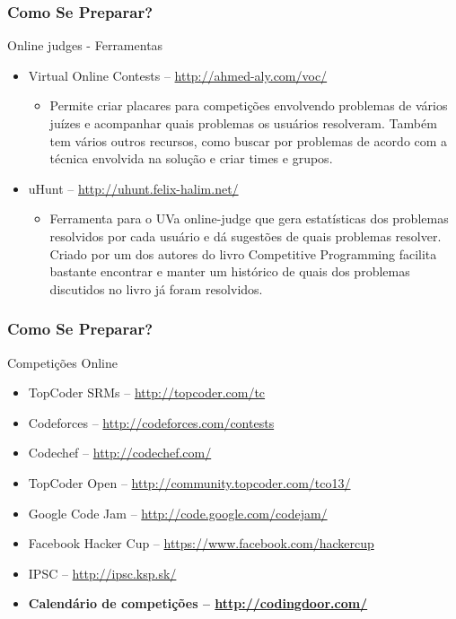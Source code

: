 \begin{frame}
\frametitle{Como Se Preparar?}
\begin{block}{Online judges - Ferramentas}
\begin{itemize}
	\item Virtual Online Contests -- \url{http://ahmed-aly.com/voc/}
	\begin{itemize}
		\item Permite criar placares para competições envolvendo problemas de vários juízes e acompanhar quais problemas os usuários resolveram. Também tem vários outros recursos, como buscar por problemas de acordo com a técnica envolvida na solução e criar times e grupos.
	\end{itemize}
	\item uHunt -- \url{http://uhunt.felix-halim.net/}	
	\begin{itemize}
		\item Ferramenta para o UVa online-judge que gera estatísticas dos problemas resolvidos por cada usuário e dá sugestões de quais problemas resolver. Criado por um dos autores do livro Competitive Programming facilita bastante encontrar e manter um histórico de quais dos problemas discutidos no livro já foram resolvidos.
	\end{itemize}
\end{itemize}
\end{block}
\end{frame}

\begin{frame}
\frametitle{Como Se Preparar?}
\begin{block}{Competições Online}
\begin{itemize}
	\item TopCoder SRMs -- \url{http://topcoder.com/tc}
	\item Codeforces -- \url{http://codeforces.com/contests}
	\item Codechef -- \url{http://codechef.com/}
	\item TopCoder Open -- \url{http://community.topcoder.com/tco13/}	
	\item Google Code Jam -- \url{http://code.google.com/codejam/}
	\item Facebook Hacker Cup -- \url{https://www.facebook.com/hackercup}
	\item IPSC -- \url{http://ipsc.ksp.sk/}
	\item \bf{Calendário de competições} -- \url{http://codingdoor.com/}
\end{itemize}
\end{block}
\end{frame}

